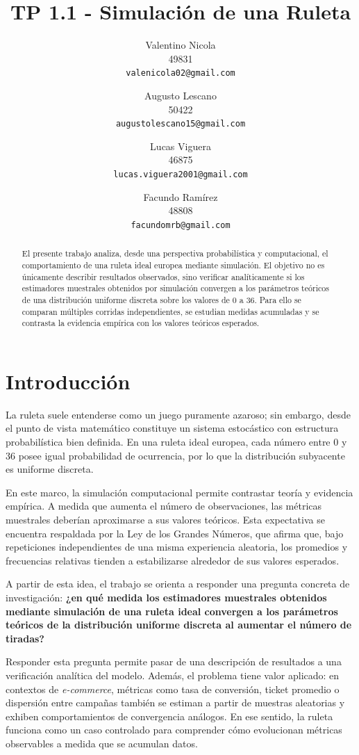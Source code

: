 \documentclass{article}
\title{TP 1.1 - Simulación de una Ruleta}
\author{
  Valentino Nicola \\
  49831 \\
  \texttt{valenicola02@gmail.com} \\
  \and
  Augusto Lescano\\
  50422 \\
  \texttt{augustolescano15@gmail.com} \\
  \and
  Lucas Viguera\\
  46875 \\
  \texttt{lucas.viguera2001@gmail.com} \\
  \and
  Facundo Ramírez \\
  48808 \\
  \texttt{facundomrb@gmail.com} \\
}
\date{}
\begin{document}
\maketitle

\begin{abstract}
El presente trabajo analiza, desde una perspectiva probabilística y computacional, el comportamiento de una ruleta ideal europea mediante simulación. El objetivo no es únicamente describir resultados observados, sino verificar analíticamente si los estimadores muestrales obtenidos por simulación convergen a los parámetros teóricos de una distribución uniforme discreta sobre los valores de 0 a 36. Para ello se comparan múltiples corridas independientes, se estudian medidas acumuladas y se contrasta la evidencia empírica con los valores teóricos esperados.
\end{abstract}

\section{Introducción}
La ruleta suele entenderse como un juego puramente azaroso; sin embargo, desde el punto de vista matemático constituye un sistema estocástico con estructura probabilística bien definida. En una ruleta ideal europea, cada número entre 0 y 36 posee igual probabilidad de ocurrencia, por lo que la distribución subyacente es uniforme discreta.

En este marco, la simulación computacional permite contrastar teoría y evidencia empírica. A medida que aumenta el número de observaciones, las métricas muestrales deberían aproximarse a sus valores teóricos. Esta expectativa se encuentra respaldada por la Ley de los Grandes Números, que afirma que, bajo repeticiones independientes de una misma experiencia aleatoria, los promedios y frecuencias relativas tienden a estabilizarse alrededor de sus valores esperados.

A partir de esta idea, el trabajo se orienta a responder una pregunta concreta de investigación: \textbf{¿en qué medida los estimadores muestrales obtenidos mediante simulación de una ruleta ideal convergen a los parámetros teóricos de la distribución uniforme discreta al aumentar el número de tiradas?}

Responder esta pregunta permite pasar de una descripción de resultados a una verificación analítica del modelo. Además, el problema tiene valor aplicado: en contextos de \textit{e-commerce}, métricas como tasa de conversión, ticket promedio o dispersión entre campañas también se estiman a partir de muestras aleatorias y exhiben comportamientos de convergencia análogos. En ese sentido, la ruleta funciona como un caso controlado para comprender cómo evolucionan métricas observables a medida que se acumulan datos.
\end{document}
